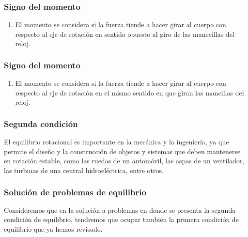 \documentclass[12pt]{beamer}
\begin{document}
\begin{frame}
\frametitle{Signo del momento}
\begin{enumerate}[<+->]
\item El momento se considera  \pause si la fuerza tiende a hacer girar al cuerpo con respecto al eje de rotación en sentido opuesto al giro de las manecillas del reloj.
\\
\begin{figure}
  \centering
\end{figure}
\seti
\end{enumerate}
\end{frame}
\begin{frame}
\frametitle{Signo del momento}
\begin{enumerate}[<+->]
\conti
\item El momento se considera  \pause si la fuerza tiende a hacer girar al cuerpo con respecto al eje de rotación en el mismo sentido en que giran las mancillas del reloj.
\\
\begin{figure}
  \centering
\end{figure}
\end{enumerate}
\end{frame}
\begin{frame}
\frametitle{Segunda condición}
El equilibrio rotacional es importante en la mecánica y la ingeniería, \pause ya que permite el diseño y la construcción de objetos y sistemas que deben mantenerse en rotación estable, como las ruedas de un automóvil, las aspas de un ventilador, las turbinas de una central hidroeléctrica, entre otros.
\end{frame}
\begin{frame}
\frametitle{Solución de problemas de equilibrio}
Consideremos que en la solución a problemas en donde se presenta la segunda condición de equilibrio, \pause tendremos que ocupar también la primera condición de equilibrio que ya hemos revisado.
\end{frame}
\end{document}
